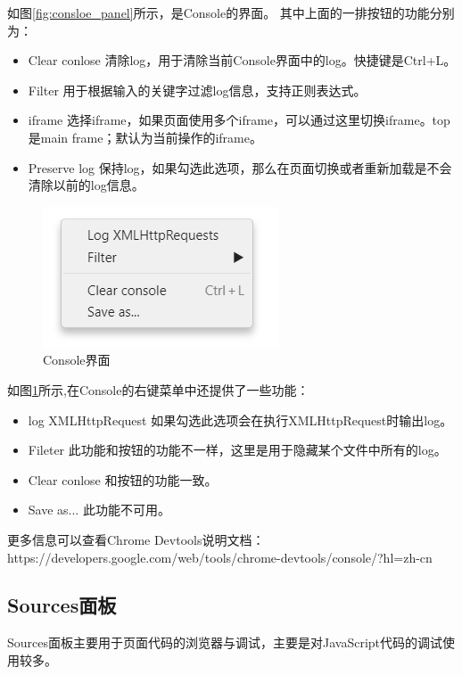 如图\ref{fig:consloe_panel}所示，是Console的界面。
其中上面的一排按钮的功能分别为：
\begin{itemize}
\item Clear conlose 清除log，用于清除当前Console界面中的log。快捷键是Ctrl+L。
\item Filter 用于根据输入的关键字过滤log信息，支持正则表达式。
\item iframe 选择iframe，如果页面使用多个iframe，可以通过这里切换iframe。top是main frame；默认为当前操作的iframe。
\item Preserve log 保持log，如果勾选此选项，那么在页面切换或者重新加载是不会清除以前的log信息。
\end{itemize}

\begin{figure}[H] 
\centering 
\includegraphics{image/devtools_study/consloe_right_menu.png} 
\caption{Console界面} \label{fig:consloe_right_menu} 
\end{figure}

如图\ref{fig:consloe_right_menu}所示,在Console的右键菜单中还提供了一些功能：
\begin{itemize}
\item log XMLHttpRequest 如果勾选此选项会在执行XMLHttpRequest时输出log。
\item Fileter 此功能和按钮的功能不一样，这里是用于隐藏某个文件中所有的log。
\item Clear conlose 和按钮的功能一致。
\item Save as... 此功能不可用。
\end{itemize}

更多信息可以查看Chrome Devtools说明文档：https://developers.google.com/web/tools/chrome-devtools/console/?hl=zh-cn

\subsection{Sources面板}
Sources面板主要用于页面代码的浏览器与调试，主要是对JavaScript代码的调试使用较多。

